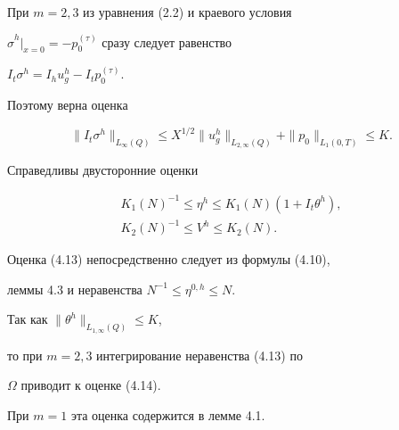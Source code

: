 \documentclass[12pt]{article}
\theoremstyle{plain} %
\theoremstyle{definition}
\newtheorem{corm}{\hskip\parindent Следствие}[section]
\numberwithin{equation}{section}
\begin{document}
При $m=2,3$ из уравнения (2.2) и краевого условия


$\widehat\sigma^h|_{x=0}=-p^{(\tau)}_0$ сразу следует равенство


$I_t\sigma^h = I_hu^h_g - I_tp^{(\tau)}_0.$


Поэтому верна оценка


$$


\|I_t\sigma^h\|_{L_\infty(Q)}\le X^{1/2}\|u^h_g\|_{L_{2,\infty}(Q)} +


\|p_0\|_{L_1(0,T)}\le K.


$$





\begin{corm} Справедливы двусторонние оценки


\begin{gather}


K_1(N)^{-1}\le\eta^h\le K_1(N)(1+I_t\theta^h),\\


%


K_2(N)^{-1}\le V^h\le K_2(N).


\end{gather}


\end{corm}





\begin{pf} Оценка (4.13) непосредственно следует из формулы (4.10),


леммы 4.3 и неравенства $N^{-1}\le\eta^{0,h}\le N$.


Так как $\|\theta^h\|_{L_{1,\infty}(Q)}\le K$,


то при $m=2,3$ интегрирование неравенства (4.13) по


$\Omega$ приводит к оценке (4.14).


При $m=1$ эта оценка содержится в лемме 4.1.


\end{pf}
\end{document}
